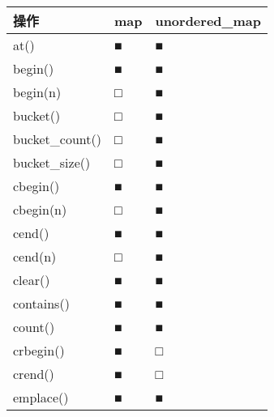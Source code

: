 \begin{longtable}{|l|l|l|}
\hline
\textbf{操作}                           & \textbf{map} & \textbf{unordered\_map} \\ \hline
\endfirsthead
%
\endhead
%
at()                                         & ■            & ■                       \\ \hline
begin()                                      & ■            & ■                       \\ \hline
begin(n)                                     & □            & ■                       \\ \hline
bucket()                                     & □            & ■                       \\ \hline
bucket\_count()                              & □            & ■                       \\ \hline
bucket\_size()                               & □            & ■                       \\ \hline
cbegin()                                     & ■            & ■                       \\ \hline
cbegin(n)                                    & □            & ■                       \\ \hline
cend()                                       & ■            & ■                       \\ \hline
cend(n)                                      & □            & ■                       \\ \hline
clear()                                      & ■            & ■                       \\ \hline
contains()                                   & ■            & ■                       \\ \hline
count()                                      & ■            & ■                       \\ \hline
crbegin()                                    & ■            & □                       \\ \hline
crend()                                      & ■            & □                       \\ \hline
emplace()                                    & ■            & ■                       \\ \hline

\end{longtable}
